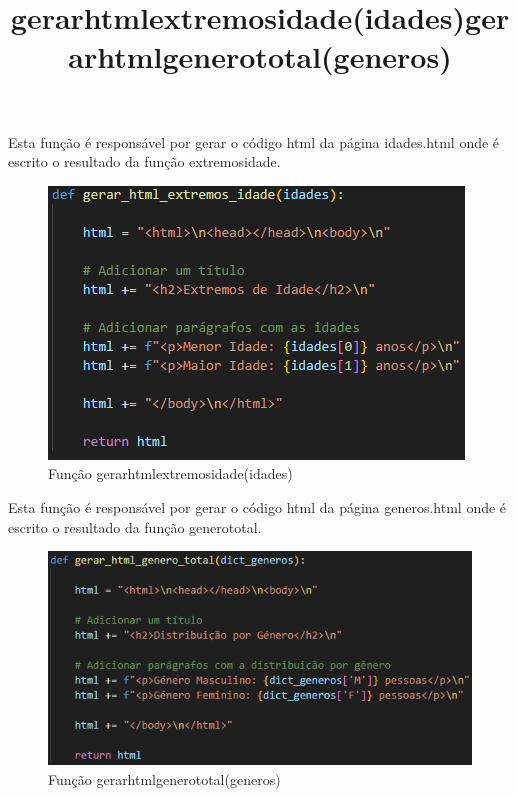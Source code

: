 \documentclass[11pt,a4paper]{report}%
\begin{document}
\title{\textbf{gerar\textunderscore html\textunderscore extremos\textunderscore idade(idades)}}

Esta função é responsável por gerar o código html da página idades.html onde é escrito o resultado da função extremos\textunderscore idade.


\begin{figure}[htbp]
\centerline{\includegraphics{gerar_html_extremos_idade.png}}
\caption{Função gerar\textunderscore html\textunderscore extremos\textunderscore idade(idades)}
\label{fig}
\end{figure}  

\newpage
\title{\textbf{gerar\textunderscore html\textunderscore genero\textunderscore total(generos)}}

Esta função é responsável por gerar o código html da página generos.html onde é escrito o resultado da função genero\textunderscore total.


\begin{figure}[htbp]
\centerline{\includegraphics[scale=0.8]{gerar_html_genero_total.png}}
\caption{Função gerar\textunderscore html\textunderscore genero\textunderscore total(generos)}
\label{fig}
\end{figure}  
\end{document}
